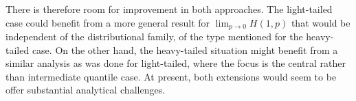 \documentclass[11pt]{article}
\newcommand{\al}{\ensuremath{\beta}}
\newcommand{\rc}{\color{red}}
\newcommand{\nc}{\normalcolor}
\begin{document}
There is therefore room for improvement in both approaches. The light-tailed
  case could benefit from a more general result for
  $\lim_{p\rightarrow 0}H(1,p)$ that would be independent of the
  distributional family, of the type mentioned for the heavy-tailed
  case. On the other hand, the heavy-tailed situation might benefit from a similar
  analysis as was done for light-tailed, where the focus is the central rather
  than intermediate quantile case. At present, both extensions would
  seem to be offer substantial analytical challenges. 

\nc


\appendix
\end{document}
